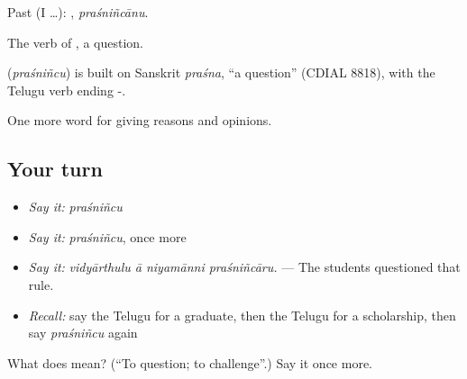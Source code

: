 Past (I …): , \emph{praśniñcānu}.

The verb of , a question.

\begin{cousinweb}
\textbf{} (\emph{praśniñcu}) is built on Sanskrit \emph{praśna}, \textquotedblleft{}a question\textquotedblright{} (CDIAL 8818), with the Telugu verb ending -.
\end{cousinweb}

\begin{grammarlens}[title={What you've built}]
One more word for giving reasons and opinions.
\end{grammarlens}

\subsection*{Your turn}
\begin{itemize}
\raggedright
  \item \emph{Say it:} \emph{praśniñcu}
  \item \emph{Say it:} \emph{praśniñcu}, once more
  \item \emph{Say it:} \emph{vidyārthulu ā niyamānni praśniñcāru.} — The students questioned that rule.
  \item \emph{Recall:} say the Telugu for a graduate, then the Telugu for a scholarship, then say \emph{praśniñcu} again
\end{itemize}

\begin{tcolorbox}[breakable,colback=teal!4,colframe=teal!35!black,title={Before you move on}]
What does  mean? (\textquotedblleft{}To question; to challenge\textquotedblright{}.) Say it once more.
\end{tcolorbox}

